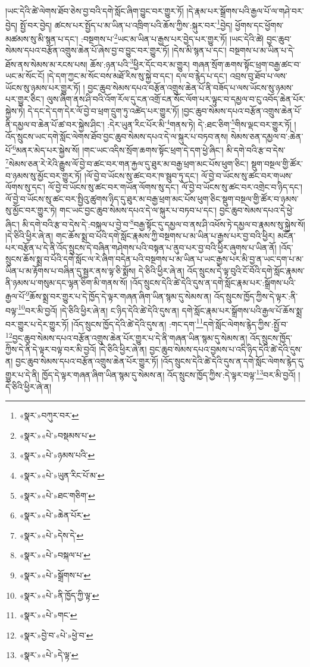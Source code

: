 །ཡང་དེའི་ཚེ་ལེགས་ཐོབ་ཅེས་བྱ་བའི་དགེ་སློང་ཞིག་བྱུང་བར་གྱུར་ཏོ། །དེ་རྣམ་པར་སྒྲོགས་པའི་རྒྱལ་པོ་ལ་གཤེ་བར་བྱེད། སྤྱོ་བར་བྱེད། ཚངས་པར་སྤྱོད་པ་མ་ཡིན་པ་འཁྲིག་པའི་ཆོས་ཀྱིས་:སྐུར་བར་\footnote{«སྣར་»བཀུར་བར་}བྱེད། ཕྱོགས་དང་ཕྱོགས་མཚམས་སུ་མི་སྙན་པ་དང་། :བསྔགས་པ་\footnote{«སྣར་»«པེ་»བསྡམས་པ་}ཡང་མ་ཡིན་པ་རྒྱས་པར་བྱེད་པར་གྱུར་ཏོ། །ཡང་དེའི་ཚེ། བྱང་ཆུབ་སེམས་དཔའ་བརྩོན་འགྲུས་ཆེན་པོ་ཞེས་བྱ་བ་བྱུང་བར་གྱུར་ཏོ། །དེས་མི་སྙན་པ་དང་། བསྔགས་པ་མ་ཡིན་པ་དེ་ཐོས་ནས་སེམས་མ་རངས་པས། ཆོས་:ཉན་པའི་\footnote{«སྣར་»«པེ་»ཉམས་པའི་}ཕྱིར་དོང་བར་མ་གྱུར། གཞན་སྲོག་ཆགས་སྟོང་ཕྲག་བརྒྱ་ཚང་བ་ཡང་མ་སོང་ངོ། །དེ་དག་ཀྱང་མ་སོང་བས་མཐོ་རིས་སུ་སྐྱེ་བ་དང་། དལ་བ་རྙེད་པ་དང་། འབྲས་བུ་ཐོབ་པ་ལས་ཡོངས་སུ་ཉམས་པར་གྱུར་ཏོ། །
བྱང་ཆུབ་སེམས་དཔའ་བརྩོན་འགྲུས་ཆེན་པོ་ནི་བཟོད་པ་ལས་ཡོངས་སུ་ཉམས་པར་གྱུར་ཅིང་། ལུས་ཞིག་ནས་ཤི་བའི་འོག་རོལ་དུ་ངན་འགྲོ་ངན་སོང་ལོག་པར་ལྟུང་བ་དམྱལ་བ་ངུ་འབོད་ཆེན་པོར་སྐྱེས་ཏེ། དེ་དང་དེ་དག་དེར་ལོ་བྱེ་བ་ཕྲག་དྲུག་ཏུ་འཚེད་པར་གྱུར་ཏོ། །བྱང་ཆུབ་སེམས་དཔའ་བརྩོན་འགྲུས་ཆེན་པོ་ནི་དམྱལ་བ་ཆེན་པོ་ཚ་བར་སྐྱེས་ཤིང་། :དེར་ཡུན་རིང་པོར་མི་\footnote{«སྣར་»«པེ་»ཡུན་རིང་པོ་མ་}གནས་ཏེ། དེ་:ཐང་ཅིག་\footnote{«སྣར་»«པེ་»ཐང་གཅིག་}གིས་ལྡང་བར་གྱུར་ཏོ། །འོད་སྲུངས་ཡང་དགེ་སློང་ལེགས་ཐོབ་བྱང་ཆུབ་སེམས་དཔའ་དེ་ལ་སྐུར་པ་བཏབ་ནས། སེམས་ཅན་དམྱལ་བ་:ཆེན་པོ་\footnote{«སྣར་»«པེ་»ཆེན་པོར་}མནར་མེད་པར་སྐྱེས་སོ། །གང་ཡང་འདིས་སྲོག་ཆགས་སྟོང་ཕྲག་དེ་དག་ཕྱེ་ཞིང་། མི་དགེ་བའི་རྩ་བ་དེས་\footnote{«སྣར་»«པེ་»དེས་དེ་}སེམས་ཅན་རེ་རེའི་རྒྱུས་ལོ་བྱེ་བ་ཚང་བར་གན་རྐྱལ་དུ་ཐུར་མ་བརྒྱ་ཕྲག་མང་པོས་ཕུག་ཅིང་། སྡུག་བསྔལ་གྱི་ཚོར་བ་ཉམས་སུ་མྱོང་བར་གྱུར་ཏོ། །ལོ་བྱེ་བ་ཡོངས་སུ་ཚང་བར་ཁ་སྦུབ་ཏུ་དང་། ལོ་བྱེ་བ་ཡོངས་སུ་ཚང་བར་གཡས་ལོགས་སུ་དང་། ལོ་བྱེ་བ་ཡོངས་སུ་ཚང་བར་གཡོན་ལོགས་སུ་དང་། ལོ་བྱེ་བ་ཡོངས་སུ་ཚང་བར་འགྲེང་བ་ཉིད་དང་། ལོ་བྱེ་བ་ཡོངས་སུ་ཚང་བར་སྤྱིའུ་ཚུགས་ཉིད་དུ་ཐུར་མ་བརྒྱ་ཕྲག་མང་པོས་ཕུག་ཅིང་སྡུག་བསྔལ་གྱི་ཚོར་བ་ཉམས་སུ་མྱོང་བར་གྱུར་ཏེ། གང་ཡང་བྱང་ཆུབ་སེམས་དཔའ་དེ་ལ་སྐུར་པ་བཏབ་པ་དང་། བྱང་ཆུབ་སེམས་དཔའ་དེ་ཕྱེ་ཞིང་། མི་དགེ་བའི་རྩ་བ་དེས་དེ་:བསྐལ་པ་བྱེ་བ་\footnote{«སྣར་»«པེ་»བསྐལ་པ་}བརྒྱ་སྟོང་དུ་དམྱལ་བ་ནས་ཤི་འཕོས་ཏེ་དམྱལ་བ་རྣམས་སུ་སྐྱེས་སོ། །དེ་ཅིའི་ཕྱིར་ཞེ་ན། གང་ཆོས་སྨྲ་བ་པོའི་དགེ་སློང་རྣམས་ཀྱི་བསྔགས་པ་མ་ཡིན་པ་རྒྱས་པར་བྱ་བའི་ཕྱིར། མངོན་པར་བརྩོན་པ་དེ་ནི་འོད་སྲུངས་དེ་བཞིན་གཤེགས་པའི་བསྟན་པ་ནུབ་པར་བྱ་བའི་ཕྱིར་ཞུགས་པ་ཡིན་ནོ། །འོད་སྲུངས་ཆོས་སྨྲ་བ་པོའི་དགེ་སློང་ལ་རེ་ཞིག་བདེན་པའི་བསྔགས་པ་མ་ཡིན་པ་ཡང་རྒྱས་པར་མི་བྱ་ན་ཡང་དག་པ་མ་ཡིན་པ་མ་རྟོགས་པ་བཞིན་དུ་སྦྱར་ནས་ལྟ་ཅི་སྨོས། དེ་ཅིའི་ཕྱིར་ཞེ་ན། འོད་སྲུངས་དེ་ལྟ་བུའི་ངོ་བོའི་དགེ་སློང་རྣམས་ནི་ཉམས་པ་གསུམ་དང་ལྷན་ཅིག་མི་གནས་སོ། །འོད་སྲུངས་དེའི་ཚེ་དེའི་དུས་ན་དགེ་སློང་རྣམ་པར་:སྒྲོགས་པའི་རྒྱལ་པོ་\footnote{«སྣར་»«པེ་»སྒྲོགས་པ་}ཆོས་སྨྲ་བར་གྱུར་པ་དེ་ཁྱོད་དེ་ལྟར་གཞན་ཞིག་ཡིན་སྙམ་དུ་སེམས་ན། འོད་སྲུངས་ཁྱོད་ཀྱིས་དེ་ལྟར་:ནི་བལྟ་\footnote{«སྣར་»«པེ་»ནི་ཁྱོད་ཀྱི་ལྟ་}བར་མི་བྱའོ། །དེ་ཅིའི་ཕྱིར་ཞེ་ན། ང་ཉིད་དེའི་ཚེ་དེའི་དུས་ན། དགེ་སློང་རྣམ་པར་སྒྲོགས་པའི་རྒྱལ་པོ་ཆོས་སྨྲ་བར་གྱུར་པ་དེར་གྱུར་ཏོ། །འོད་སྲུངས་ཁྱོད་དེའི་ཚེ་དེའི་དུས་ན། :གང་དག་\footnote{«སྣར་»«པེ་»གང་}དགེ་སློང་ལེགས་རྙེད་ཀྱིས་:སྤྱོ་བ་\footnote{«སྣར་»བྱེ་བ་«པེ་»ཕྱེ་བ་}བྱང་ཆུབ་སེམས་དཔའ་བརྩོན་འགྲུས་ཆེན་པོར་གྱུར་པ་དེ་ནི་གཞན་ཡིན་སྙམ་དུ་སེམས་ན། འོད་སྲུངས་ཁྱོད་ཀྱིས་དེ་ནི་དེ་ལྟར་བལྟ་བར་མི་བྱའོ། །དེ་ཅིའི་ཕྱིར་ཞེ་ན། བྱང་ཆུབ་སེམས་དཔའ་བྱམས་པ་འདི་ཉིད་དེའི་ཚེ་དེའི་དུས་ན། བྱང་ཆུབ་སེམས་དཔའ་བརྩོན་འགྲུས་ཆེན་པོར་གྱུར་ཏོ། །འོད་སྲུངས་དེའི་ཚེ་དེའི་དུས་ན་དགེ་སློང་ལེགས་རྙེད་དུ་གྱུར་པ་དེ་ནི། ཁྱོད་དེ་ལྟར་གཞན་ཞིག་ཡིན་སྙམ་དུ་སེམས་ན། འོད་སྲུངས་ཁྱོད་ཀྱིས་:དེ་ལྟར་བལྟ་\footnote{«སྣར་»«པེ་»དེ་ལྟ་}བར་མི་བྱའོ། །དེ་ཅིའི་ཕྱིར་ཞེ་ན། 